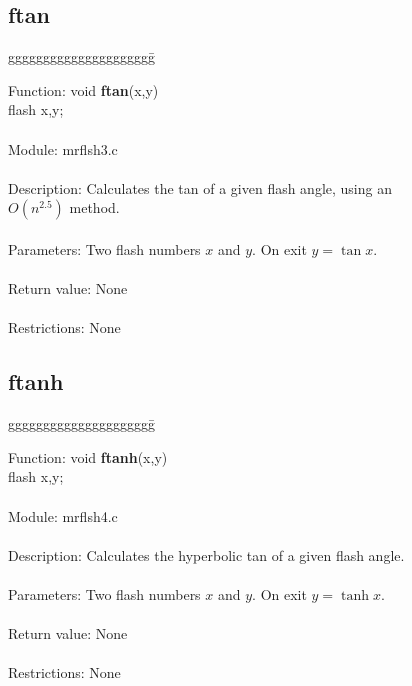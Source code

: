 \subsection{ftan}

\begin{tabbing}
ggggggggggggggggggggg\= \kill

      Function:      \>void {\bf ftan}(x,y) \\
                     \>flash x,y; \\
      \ \\
      Module:        \>mrflsh3.c \\
      \ \\
      Description:   \>Calculates the tan of a given flash angle, using an   \\
                     \>$O(n^{2.5})$ method. \\
      \ \\
      Parameters:    \>Two flash numbers $x$ and $y$. On exit $y=\tan x$. \\
      \ \\
      Return value:  \>None \\
      \ \\
      Restrictions:  \>None \\

\end{tabbing}
\pagebreak
\subsection{ftanh}

\begin{tabbing}
ggggggggggggggggggggg\= \kill

      Function:      \>void {\bf ftanh}(x,y) \\
                     \>flash x,y; \\
      \ \\
      Module:        \>mrflsh4.c \\
      \ \\
      Description:   \>Calculates the hyperbolic tan of a given flash angle. \\
      \ \\
      Parameters:    \>Two flash numbers $x$ and $y$. On exit $y=\tanh x$. \\
      \ \\
      Return value:  \>None \\
      \ \\
      Restrictions:  \>None \\

\end{tabbing}

